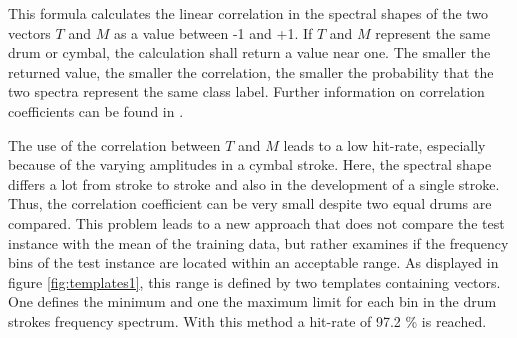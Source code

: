 
This formula calculates the linear correlation in the spectral shapes of the two vectors $T$ and $M$ as a value between -1 and +1. If $T$ and $M$ represent the same drum or cymbal, the calculation shall return a value near one. The smaller the returned value, the smaller the correlation, the smaller the probability that the two spectra represent the same class label. Further information on correlation coefficients can be found in \autocite{Hedderich:2012}. 

%
%

The use of the correlation between $T$ and $M$ leads to a low hit-rate, especially because of the varying amplitudes in a cymbal stroke. Here, the spectral shape differs a lot from stroke to stroke and also in the development of a single stroke. Thus, the correlation coefficient can be very small despite two equal drums are compared. This problem leads to a new approach that does not compare the test instance with the mean of the training data, but rather examines if the frequency bins of the test instance are located within an acceptable range. As displayed in figure \ref{fig:templates1}, this range is defined by two templates containing vectors. One defines the minimum and one the maximum limit for each bin in the drum strokes frequency spectrum. With this method a hit-rate of 97.2 \% is reached.

